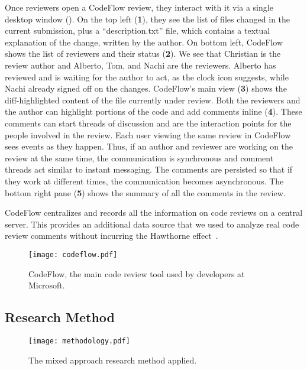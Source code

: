 Once reviewers open a CodeFlow review, they interact with it via a single
desktop window (). On the top left (\textbf{1}), they see the list of files
changed in the current submission, plus a ``description.txt'' file, which
contains a textual explanation of the change, written by the author. On bottom
left, CodeFlow shows the list of reviewers and their status (\textbf{2}). We see that
Christian is the review author and Alberto, Tom, and Nachi are the reviewers.
Alberto has reviewed and is waiting for the author to act, as the clock icon
suggests, while Nachi already signed off on the changes. CodeFlow's main view
(\textbf{3}) shows the diff-highlighted content of the file currently under review. Both
the reviewers and the author can highlight portions of the code and add
comments inline (\textbf{4}). These comments can start threads of discussion and are the
interaction points for the people involved in the review. Each user viewing the
same review in CodeFlow sees events as they happen.  Thus, if an author and
reviewer are working on the review at the same time, the communication is
synchronous and comment threads act similar to instant messaging. The comments
are persisted so that if they work at different times, the communication
becomes asynchronous. The bottom right pane (\textbf{5}) shows the summary of all the
comments in the review. 

CodeFlow centralizes and records all the information on code reviews on a
central server. This provides an additional data source that we used to analyze
real code review comments without incurring the Hawthorne effect~\cite{adair1984hawthorne}.



\begin{figure}[t] %
   \centering
   \texttt{[image: codeflow.pdf]}
   \caption{CodeFlow, the main code review tool used by developers at Microsoft.}
   \label{fig:codeflow:screenshot}
      \vspace{-1.5em}
\end{figure}



\subsection{Research Method}

\begin{figure*}[t] %
   \centering
   \texttt{[image: methodology.pdf]}
   \caption{The mixed approach research method applied.}
   \label{fig:research-method}
   \vspace{-1.5em}
\end{figure*}

